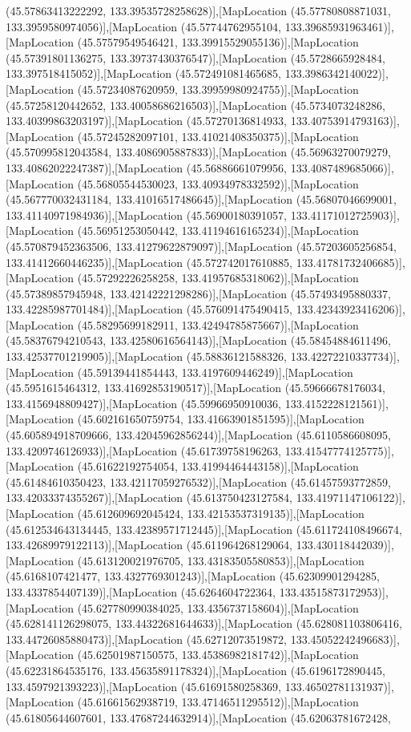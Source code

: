 (45.57863413222292, 133.39535728258628)],[MapLocation (45.57780808871031, 133.3959580974056)],[MapLocation (45.57744762955104, 133.39685931963461)],[MapLocation (45.57579549546421, 133.39915529055136)],[MapLocation (45.57391801136275, 133.39737430376547)],[MapLocation (45.5728665928484, 133.397518415052)],[MapLocation (45.572491081465685, 133.3986342140022)],[MapLocation (45.57234087620959, 133.39959980924755)],[MapLocation (45.57258120442652, 133.40058686216503)],[MapLocation (45.5734073248286, 133.40399863203197)],[MapLocation (45.57270136814933, 133.40753914793163)],[MapLocation (45.57245282097101, 133.41021408350375)],[MapLocation (45.570995812043584, 133.4086905887833)],[MapLocation (45.56963270079279, 133.40862022247387)],[MapLocation (45.56886661079956, 133.4087489685066)],[MapLocation (45.56805544530023, 133.40934978332592)],[MapLocation (45.567770032431184, 133.41016517486645)],[MapLocation (45.56807046699001, 133.41140971984936)],[MapLocation (45.56900180391057, 133.41171012725903)],[MapLocation (45.56951253050442, 133.41194616165234)],[MapLocation (45.570879452363506, 133.41279622879097)],[MapLocation (45.57203605256854, 133.41412660446235)],[MapLocation (45.572742017610885, 133.41781732406685)],[MapLocation (45.57292226258258, 133.41957685318062)],[MapLocation (45.57389857945948, 133.42142221298286)],[MapLocation (45.57493495880337, 133.42285987701484)],[MapLocation (45.576091475490415, 133.42343923416206)],[MapLocation (45.58295699182911, 133.42494785875667)],[MapLocation (45.58376794210543, 133.42580616564143)],[MapLocation (45.58454884611496, 133.42537701219905)],[MapLocation (45.58836121588326, 133.42272210337734)],[MapLocation (45.59139441854443, 133.4197609446249)],[MapLocation (45.5951615464312, 133.41692853190517)],[MapLocation (45.59666678176034, 133.4156948809427)],[MapLocation (45.59966950910036, 133.4152228121561)],[MapLocation (45.602161650759754, 133.41663901851595)],[MapLocation (45.605894918709666, 133.42045962856244)],[MapLocation (45.6110586608095, 133.4209746126933)],[MapLocation (45.61739758196263, 133.41547774125775)],[MapLocation (45.61622192754054, 133.41994464443158)],[MapLocation (45.61484610350423, 133.42117059276532)],[MapLocation (45.61457593772859, 133.42033374355267)],[MapLocation (45.613750423127584, 133.41971147106122)],[MapLocation (45.612609692045424, 133.42153537319135)],[MapLocation (45.612534643134445, 133.42389571712445)],[MapLocation (45.611724108496674, 133.42689979122113)],[MapLocation (45.611964268129064, 133.430118442039)],[MapLocation (45.613120021976705, 133.43183505580853)],[MapLocation (45.6168107421477, 133.4327769301243)],[MapLocation (45.62309901294285, 133.4337854407139)],[MapLocation (45.6264604722364, 133.43515873172953)],[MapLocation (45.627780990384025, 133.4356737158604)],[MapLocation (45.628141126298075, 133.44322681644633)],[MapLocation (45.628081103806416, 133.44726085880473)],[MapLocation (45.62712073519872, 133.45052242496683)],[MapLocation (45.62501987150575, 133.45386982181742)],[MapLocation (45.62231864535176, 133.45635891178324)],[MapLocation (45.6196172890445, 133.4597921393223)],[MapLocation (45.61691580258369, 133.46502781131937)],[MapLocation (45.61661562938719, 133.47146511295512)],[MapLocation (45.61805644607601, 133.47687244632914)],[MapLocation (45.62063781672428, 